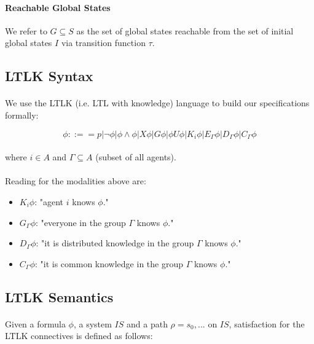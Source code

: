 \documentclass{article}
\theoremstyle{plain}
\theoremstyle{definition}
\begin{document}
\begin{multicols}{2}
\paragraph{Reachable Global States} We refer to $G \subseteq S$ as the set of global states reachable from the set of initial global states $I$ via transition function $\tau$.

\subsection{LTLK Syntax}

\paragraph{} We use the LTLK (i.e. LTL with knowledge) language to build our specifications formally:

$$\phi ::== p | \lnot \phi | \phi \land \phi | X\phi | G\phi | \phi U \phi | K_i\phi | E_\Gamma \phi | D_\Gamma \phi | C_\Gamma \phi$$

\paragraph{} where $i \in A$ and $\Gamma \subseteq A$ (subset of all agents).

\paragraph{} Reading for the modalities above are:

\begin{itemize}
\item $K_i\phi$: "agent $i$ knows $\phi$."
\item $G_\Gamma \phi$: "everyone in the group $\Gamma$ knows $\phi$."
\item $D_\Gamma \phi$: "it is distributed knowledge in the group $\Gamma$ knows $\phi$."
\item $C_\Gamma \phi$: "it is common knowledge in the group $\Gamma$ knows $\phi$."
\end{itemize}

\subsection{LTLK Semantics}

\paragraph{} Given a formula $\phi$, a system $IS$ and a path $\rho = s_0, ...$ on $IS$, satisfaction for the LTLK connectives is defined as follows:


\end{multicols}
\end{document}
